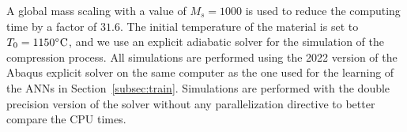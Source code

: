 \documentclass[algorithms,article,submit,pdftex,oneauthors]{Definitions/mdpi}
\DeclareRobustCommand{\mdot}[1]{\accentset{\mbox{\bfseries .}}{#1}}
\DeclareRobustCommand{\ps}{\text{s}^{-1}}
\DeclareRobustCommand{\GPa}{\text{GPa}}
\begin{document}
A global mass scaling with a value of $M_s=1000$ is used to reduce the computing time by a factor of $31.6$.
The initial temperature of the material is set to $T_{0}=1150\celsius$, and we use an explicit adiabatic solver for the simulation of the compression process.
All simulations are performed using the 2022 version of the Abaqus explicit solver on the same computer as the one used for the learning of the ANNs in Section~\ref{subsec:train}.
Simulations are performed with the double precision version of the solver without any parallelization directive to better compare the CPU times.
\end{document}
